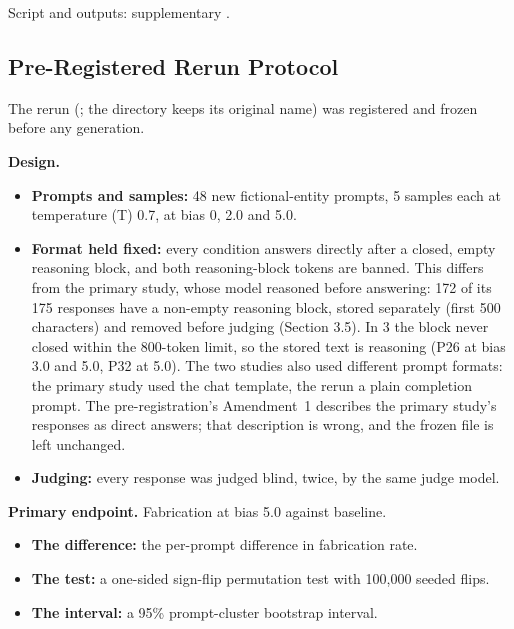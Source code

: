 \documentclass[11pt,letterpaper]{article}
\providecommand{\tightlist}{\setlength{\itemsep}{0pt}\setlength{\parskip}{0pt}}
\DeclareRobustCommand{\_}{\textunderscore\allowbreak}
\begin{document}
Script and outputs: supplementary .

\hypertarget{pre-registered-rerun-protocol}{%
\subsection{Pre-Registered Rerun Protocol}\label{pre-registered-rerun-protocol}}

The rerun (; the directory keeps its original name) was registered and frozen before any generation.

\textbf{Design.}

\begin{itemize}
\tightlist
\item
  \textbf{Prompts and samples:} 48 new fictional-entity prompts, 5 samples each at temperature (T) 0.7, at bias 0, 2.0 and 5.0.
\item
  \textbf{Format held fixed:} every condition answers directly after a closed, empty reasoning block, and both reasoning-block tokens are banned. This differs from the primary study, whose model reasoned before answering: 172 of its 175 responses have a non-empty reasoning block, stored separately (first 500 characters) and removed before judging (Section 3.5). In 3 the block never closed within the 800-token limit, so the stored text is reasoning (P26 at bias 3.0 and 5.0, P32 at 5.0). The two studies also used different prompt formats: the primary study used the chat template, the rerun a plain completion prompt. The pre-registration's Amendment~1 describes the primary study's responses as direct answers; that description is wrong, and the frozen file is left unchanged.
\item
  \textbf{Judging:} every response was judged blind, twice, by the same judge model.
\end{itemize}

\textbf{Primary endpoint.} Fabrication at bias 5.0 against baseline.

\begin{itemize}
\tightlist
\item
  \textbf{The difference:} the per-prompt difference in fabrication rate.
\item
  \textbf{The test:} a one-sided sign-flip permutation test with 100,000 seeded flips.
\item
  \textbf{The interval:} a 95\% prompt-cluster bootstrap interval.
\end{itemize}
\end{document}
